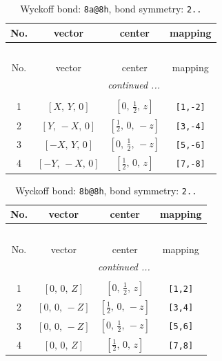 \documentclass[fleqn,8pt]{jsarticle}
\begin{document}
\begin{longtable}{cccc}
\caption{Wyckoff bond: {\tt 8a@8h}, bond symmetry: {\tt 2..}}
 \\
 \hline \hline
No. & vector & center & mapping \\ \hline \endfirsthead

\multicolumn{3}{l}{\tablename\ \thetable{}} \\
 \hline \hline
No. & vector & center & mapping \\ \hline \endhead

 \hline \hline
\multicolumn{3}{r}{\footnotesize\it continued ...} \\ \endfoot

 \hline \hline
\multicolumn{3}{r}{} \\ \endlastfoot

1 & $\left[ X,\, Y,\, 0 \right]$ & $\left[ 0,\, \frac{1}{2},\, z \right]$ & {\tt [1,-2]} \\ \hline
2 & $\left[ Y,\, - X,\, 0 \right]$ & $\left[ \frac{1}{2},\, 0,\, - z \right]$ & {\tt [3,-4]} \\ \hline
3 & $\left[ - X,\, Y,\, 0 \right]$ & $\left[ 0,\, \frac{1}{2},\, - z \right]$ & {\tt [5,-6]} \\ \hline
4 & $\left[ - Y,\, - X,\, 0 \right]$ & $\left[ \frac{1}{2},\, 0,\, z \right]$ & {\tt [7,-8]} \\
\end{longtable}
\renewcommand{\arraystretch}{1.2}
\begin{longtable}{cccc}
\caption{Wyckoff bond: {\tt 8b@8h}, bond symmetry: {\tt 2..}}
 \\
 \hline \hline
No. & vector & center & mapping \\ \hline \endfirsthead

\multicolumn{3}{l}{\tablename\ \thetable{}} \\
 \hline \hline
No. & vector & center & mapping \\ \hline \endhead

 \hline \hline
\multicolumn{3}{r}{\footnotesize\it continued ...} \\ \endfoot

 \hline \hline
\multicolumn{3}{r}{} \\ \endlastfoot

1 & $\left[ 0,\, 0,\, Z \right]$ & $\left[ 0,\, \frac{1}{2},\, z \right]$ & {\tt [1,2]} \\ \hline
2 & $\left[ 0,\, 0,\, - Z \right]$ & $\left[ \frac{1}{2},\, 0,\, - z \right]$ & {\tt [3,4]} \\ \hline
3 & $\left[ 0,\, 0,\, - Z \right]$ & $\left[ 0,\, \frac{1}{2},\, - z \right]$ & {\tt [5,6]} \\ \hline
4 & $\left[ 0,\, 0,\, Z \right]$ & $\left[ \frac{1}{2},\, 0,\, z \right]$ & {\tt [7,8]} \\
\end{longtable}
\end{document}
